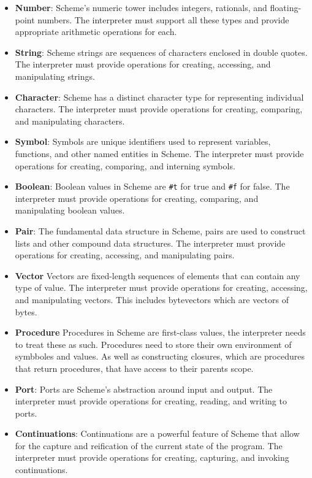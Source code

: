 \documentclass[final]{cmpreport_02}
\begin{document}
\begin{itemize}
    \item \textbf{Number}: Scheme's numeric tower includes integers, rationals, and floating-point numbers. The interpreter must support all these types and provide appropriate arithmetic operations for each.
    \item \textbf{String}: Scheme strings are sequences of characters enclosed in double quotes. The interpreter must provide operations for creating, accessing, and manipulating strings.
    \item \textbf{Character}: Scheme has a distinct character type for representing individual characters. The interpreter must provide operations for creating, comparing, and manipulating characters.
    \item \textbf{Symbol}: Symbols are unique identifiers used to represent variables, functions, and other named entities in Scheme. The interpreter must provide operations for creating, comparing, and interning symbols.
    \item \textbf{Boolean}: Boolean values in Scheme are \texttt{\#t} for true and \texttt{\#f} for false. The interpreter must provide operations for creating, comparing, and manipulating boolean values.
    \item \textbf{Pair}: The fundamental data structure in Scheme, pairs are used to construct lists and other compound data structures. The interpreter must provide operations for creating, accessing, and manipulating pairs.
    \item \textbf{Vector} Vectors are fixed-length sequences of elements that can contain any type of value. The interpreter must provide operations for creating, accessing, and manipulating vectors. This includes bytevectors which are vectors of bytes.
    \item \textbf{Procedure} Procedures in Scheme are first-class values, the interpreter needs to treat these as such. Procedures need to store their own environment of symbboles and values. As well as constructing closures, which are procedures that return procedures, that have access to their parents scope.
    \item \textbf{Port}: Ports are Scheme's abstraction around input and output. The interpreter must provide operations for creating, reading, and writing to ports.
    \item \textbf{Continuations}: Continuations are a powerful feature of Scheme that allow for the capture and reification of the current state of the program. The interpreter must provide operations for creating, capturing, and invoking continuations.
\end{itemize}
\end{document}
